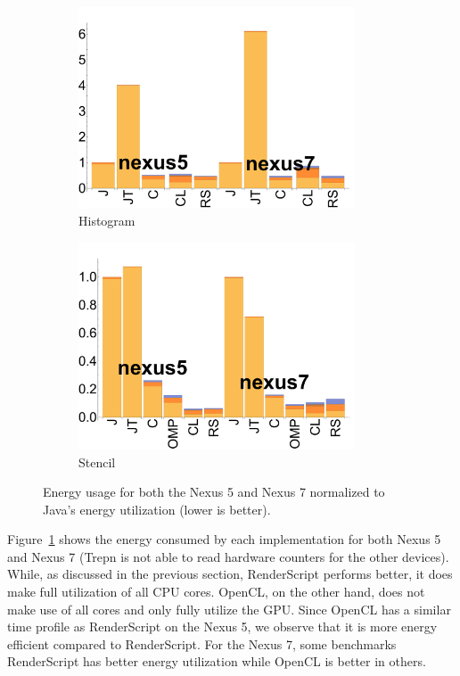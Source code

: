 \begin{figure}
  \begin{subfigure}[b]{0.23\textwidth}
      \centering
      \includegraphics[width=0.9\textwidth]{data/bbattery_histogram.pdf}
      \caption{Histogram}
  \end{subfigure}%
  \begin{subfigure}[b]{0.23\textwidth}
      \centering
      \includegraphics[width=0.9\textwidth]{data/bbattery_stencil.pdf}
      \caption{Stencil} 
  \end{subfigure}
  \caption{Energy usage for both the Nexus 5 and Nexus 7 normalized to Java's energy utilization (lower is better).}
  \label{fig:power}
\end{figure}

Figure~\ref{fig:power} shows the energy consumed by each implementation for both Nexus 5 and Nexus 7 
  (Trepn is not able to read hardware counters for the other devices).
While, as discussed in the previous section, RenderScript performs better, it does make full utilization of all CPU
  cores.
OpenCL, on the other hand, does not make use of all cores and only fully utilize the GPU.
Since OpenCL has a similar time profile as RenderScript on the Nexus 5, we observe that it is more energy efficient
  compared to RenderScript.
For the Nexus 7, some benchmarks RenderScript has better energy utilization while OpenCL is better in others.

